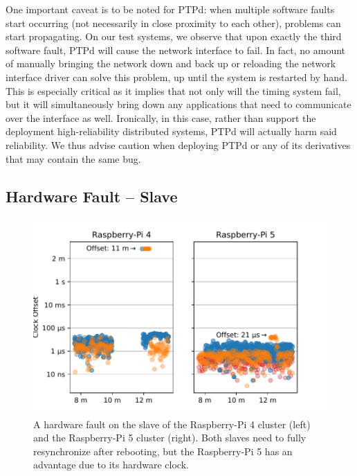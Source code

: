 One important caveat is to be noted for PTPd: when multiple software faults start occurring (not necessarily in close proximity to each other), problems can start propagating. On our test systems, we observe that upon exactly the third software fault, PTPd will cause the network interface to fail. In fact, no amount of manually bringing the network down and back up or reloading the network interface driver can solve this problem, up until the system is restarted by hand. This is especially critical as it implies that not only will the timing system fail, but it will simultaneously bring down any applications that need to communicate over the interface as well. Ironically, in this case, rather than support the deployment high-reliability distributed systems, PTPd will actually harm said reliability. We thus advise caution when deploying PTPd or any of its derivatives that may contain the same bug.

\subsection{Hardware Fault -- Slave}
\xdef\maxPiFour{\cmpMax}

\xdef\maxPiFive{\cmpMax}


\begin{figure}
    \includegraphics[width=\linewidth]{res/generated/fault/hardware/slave_cluster_comparison.pdf}
    \caption{A hardware fault on the slave of the Raspberry-Pi 4 cluster (left) and the Raspberry-Pi 5 cluster (right). Both slaves need to fully resynchronize after rebooting, but the Raspberry-Pi 5 has an advantage due to its hardware clock.}
    \label{fig:hardware_fault_slave}
\end{figure}

